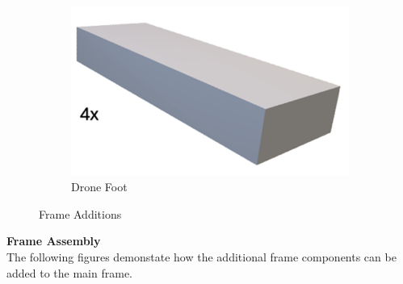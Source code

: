 \begin{figure}[H]
\begin{subfigure}[b]{0.45\textwidth}
    \end{subfigure}
    \vspace{0.5cm} 
    \begin{subfigure}[b]{0.2\textwidth}
        \centering
        \includegraphics[width=\textwidth]{img/assembly-5b.png}
        \caption{Drone Foot}
    \end{subfigure}
    \caption{Frame Additions}
\end{figure}




\pagebreak
\textbf{Frame Assembly} \\
The following figures demonstate how the additional frame components can be added to the main frame.

